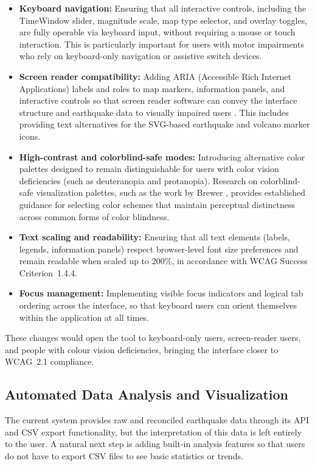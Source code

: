 \documentclass[12pt]{article}
\begin{document}
\begin{itemize}
    \item \textbf{Keyboard navigation:} Ensuring that all interactive controls, including the TimeWindow slider, magnitude scale, map type selector, and overlay toggles, are fully operable via keyboard input, without requiring a mouse or touch interaction. This is particularly important for users with motor impairments who rely on keyboard-only navigation or assistive switch devices.
    \item \textbf{Screen reader compatibility:} Adding ARIA (Accessible Rich Internet Applications) labels and roles to map markers, information panels, and interactive controls so that screen reader software can convey the interface structure and earthquake data to visually impaired users \cite{WAI_ARIA}. This includes providing text alternatives for the SVG-based earthquake and volcano marker icons.
    \item \textbf{High-contrast and colorblind-safe modes:} Introducing alternative color palettes designed to remain distinguishable for users with color vision deficiencies (such as deuteranopia and protanopia). Research on colorblind-safe visualization palettes, such as the work by Brewer \cite{Brewer2003ColorBrewer}, provides established guidance for selecting color schemes that maintain perceptual distinctness across common forms of color blindness.
    \item \textbf{Text scaling and readability:} Ensuring that all text elements (labels, legends, information panels) respect browser-level font size preferences and remain readable when scaled up to 200\%, in accordance with WCAG Success Criterion~1.4.4.
    \item \textbf{Focus management:} Implementing visible focus indicators and logical tab ordering across the interface, so that keyboard users can orient themselves within the application at all times.
\end{itemize}

These changes would open the tool to keyboard-only users, screen-reader users, and people with colour vision deficiencies, bringing the interface closer to WCAG~2.1 compliance.

\subsection{Automated Data Analysis and Visualization}

The current system provides raw and reconciled earthquake data through its API and CSV export functionality, but the interpretation of this data is left entirely to the user. A natural next step is adding built-in analysis features so that users do not have to export CSV files to see basic statistics or trends.
\end{document}
